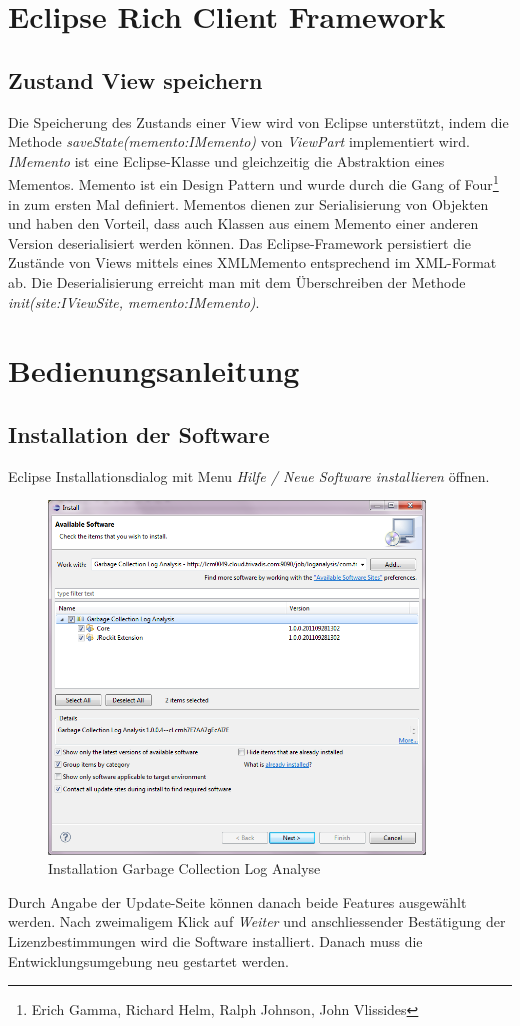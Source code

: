 \chapter{Eclipse Rich Client Framework}
\section{Zustand View speichern}\label{memento}
Die Speicherung des Zustands einer View wird von Eclipse unterstützt, indem die Methode \textit{saveState(memento:IMemento)} von \textit{ViewPart} implementiert wird. \textit{IMemento} ist eine Eclipse-Klasse und gleichzeitig die Abstraktion eines Mementos. Memento ist ein Design Pattern und wurde durch die Gang of Four\footnote{Erich Gamma, Richard Helm, Ralph Johnson, John Vlissides} in \cite[S. 283]{gamma1995design} zum ersten Mal definiert. Mementos dienen zur Serialisierung von Objekten und haben den Vorteil, dass auch Klassen aus einem Memento einer anderen Version deserialisiert werden können. Das Eclipse-Framework persistiert die Zustände von Views mittels eines XMLMemento entsprechend im XML-Format ab. Die Deserialisierung erreicht man mit dem Überschreiben der Methode \textit{init(site:IViewSite, memento:IMemento)}.

\chapter{Bedienungsanleitung}\label{bedienungsanleitung}
\section{Installation der Software}
Eclipse Installationsdialog mit Menu \textit{Hilfe / Neue Software installieren} öffnen.
 \begin{figure}[H]
  	\centering
    	\includegraphics[width=10cm]{images/tutorial_install01}
        	\caption{Installation Garbage Collection Log Analyse}
\end{figure}
Durch Angabe der Update-Seite können danach beide Features ausgewählt werden. Nach zweimaligem Klick auf \textit{Weiter} und anschliessender Bestätigung der Lizenzbestimmungen wird die Software installiert. Danach muss die Entwicklungsumgebung neu gestartet werden.


